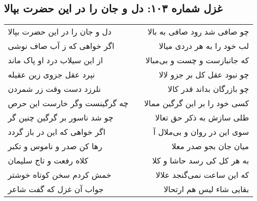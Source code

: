 \begin{center}
\section*{غزل شماره ۱۰۳: دل و جان را در این حضرت بپالا}
\label{sec:0103}
\begin{longtable}{l p{0.5cm} r}
دل و جان را در این حضرت بپالا
&&
چو صافی شد رود صافی به بالا
\\
اگر خواهی که ز آب صاف نوشی
&&
لب خود را به هر دردی میالا
\\
از این سیلاب درد او پاک ماند
&&
که جانبازست و چست و بی‌مبالا
\\
نپرد عقل جزوی زین عقیله
&&
چو نبود عقل کل بر جزو لالا
\\
نلرزد دست وقت زر شمردن
&&
چو بازرگان بداند قدر کالا
\\
چه گرگینست وگر خارست این حرص
&&
کسی خود را بر این گرگین ممالا
\\
چو شد ناسور بر گرگین چنین گر
&&
طلی سازش به ذکر حق تعالا
\\
اگر خواهی که این در باز گردد
&&
سوی این در روان و بی‌ملال آ
\\
رها کن صدر و ناموس و تکبر
&&
میان جان بجو صدر معلا
\\
کلاه رفعت و تاج سلیمان
&&
به هر کل کی رسد حاشا و کلا
\\
خمش کردم سخن کوتاه خوشتر
&&
که این ساعت نمی‌گنجد علالا
\\
جواب آن غزل که گفت شاعر
&&
بقایی شاء لیس هم ارتحالا
\\
\end{longtable}
\end{center}
